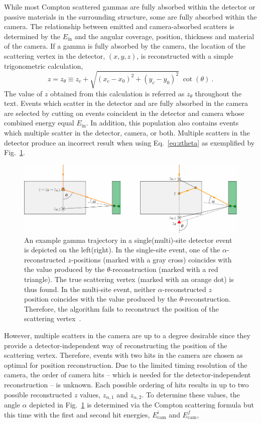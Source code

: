 While most Compton scattered gammas are fully absorbed within the detector or passive materials in the surrounding structure, some are fully absorbed within the camera. The relationship between emitted and camera-absorbed scatters is determined by the $E_\text{in}$ and the angular coverage, position, thickness and material of the camera. If a gamma is fully absorbed by the camera, the location of the scattering vertex in the detector, $(x,y,z)$, is reconstructed with a simple trigonometric calculation,
\begin{equation} \label{eq:ztheta}
    z = z_\theta \equiv z_c + \sqrt{(x_c-x_0)^2 + (y_c-y_0)^2} \;\cot(\theta)~. 
\end{equation}
The value of $z$ obtained from this calculation is referred as $z_\theta$ throughout the text. Events which scatter in the detector and are fully absorbed in the camera are selected by cutting on events coincident in the detector and camera whose combined energy equal $E_\text{in}$. In addition, this population also contains events which multiple scatter in the detector, camera, or both. Multiple scatters in the detector produce an incorrect result when using Eq.~\ref{eq:ztheta} as exemplified by Fig.~\ref{fig:cone_validation}. 
\begin{figure}[!tbh]
    \centering
    \includegraphics[width=6in]{figs/scanner/alpha_theta.pdf}
    \caption{An example gamma trajectory in a single(multi)-site detector event is depicted on the left(right). In the single-site event, one of the $\alpha$-reconstructed $z$-positions (marked with a gray cross) coincides with the value produced by the $\theta$-reconstruction (marked with a red triangle). The true scattering vertex (marked with an orange dot) is thus found. In the multi-site event, neither $\alpha$-reconstructed $z$ position coincides with the value produced by the $\theta$-reconstruction. Therefore, the algorithm fails to reconstruct the position of the scattering vertex~\cite{compton_scanner}.}
    \label{fig:cone_validation}
\end{figure}
However, multiple scatters in the camera are up to a degree desirable since they provide a detector-independent way of reconstructing the position of the scattering vertex. Therefore, events with two hits in the camera are chosen as optimal for position reconstruction. Due to the limited timing resolution of the camera, the order of camera hits -- which is needed for the detector-independent reconstruction -- is unknown. Each possible ordering of hits results in up to two possible reconstructed $z$ values, $z_{\alpha,1}$ and $z_{\alpha,2}$. To determine these values, the angle $\alpha$ depicted in Fig.~\ref{fig:cone_validation} is determined via the Compton scattering formula but this time with the first and second hit energies, $E_\text{cam}^i$ and $E_\text{cam}^f$, 
